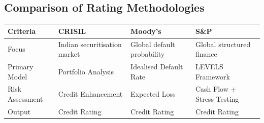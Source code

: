 \begin{center}
	
	
\end{center}

\vspace{0.6cm}

\subsection*{Comparison of Rating Methodologies}

\renewcommand{\arraystretch}{1.4}

\begin{tabularx}{\textwidth}{|p{4cm}|X|X|X|}
	\hline
	\rowcolor{TableHeader}
	\textbf{Criteria} & \textbf{CRISIL} & \textbf{Moody's} & \textbf{S\&P} \\
	\hline
	
	Focus
	&
	Indian securitisation market
	&
	Global default probability
	&
	Global structured finance
	\\
	\hline
	
	Primary Model
	&
	Portfolio Analysis
	&
	Idealised Default Rate
	&
	LEVELS Framework
	\\
	\hline
	
	Risk Assessment
	&
	Credit Enhancement
	&
	Expected Loss
	&
	Cash Flow + Stress Testing
	\\
	\hline
	
	Output
	&
	Credit Rating
	&
	Credit Rating
	&
	Credit Rating
	\\
	\hline
	
\end{tabularx}

